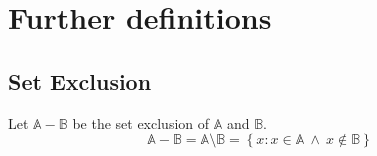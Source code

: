 \documentclass[12pt]{article}
\begin{document}


\section{Further definitions}
\subsection{Set Exclusion}
Let \(\mathbb A - \mathbb B\) be the set exclusion of \(\mathbb A\) and \(\mathbb B\).
\begin{equation}\label{eq:defs:SetExclusion}
\mathbb A - \mathbb B = \mathbb A \setminus \mathbb B = \left\{x: x\in\mathbb  A ~\wedge~ x \notin\mathbb B\right\}
\end{equation}
\end{document}
